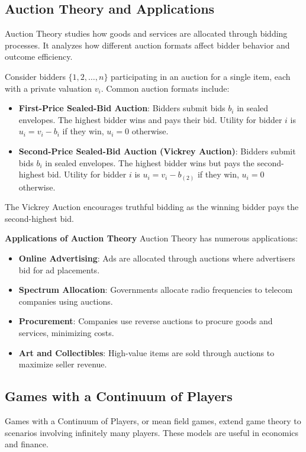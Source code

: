\documentclass[12pt]{book} %
\begin{document}
\subsection{Auction Theory and Applications}
Auction Theory studies how goods and services are allocated through bidding processes. It analyzes how different auction formats affect bidder behavior and outcome efficiency.

Consider bidders $\{1, 2, \ldots, n\}$ participating in an auction for a single item, each with a private valuation $v_i$. Common auction formats include:

\begin{itemize}
    \item \textbf{First-Price Sealed-Bid Auction}: Bidders submit bids $b_i$ in sealed envelopes. The highest bidder wins and pays their bid. Utility for bidder $i$ is $u_i = v_i - b_i$ if they win, $u_i = 0$ otherwise.
    \item \textbf{Second-Price Sealed-Bid Auction (Vickrey Auction)}: Bidders submit bids $b_i$ in sealed envelopes. The highest bidder wins but pays the second-highest bid. Utility for bidder $i$ is $u_i = v_i - b_{(2)}$ if they win, $u_i = 0$ otherwise.
\end{itemize}

The Vickrey Auction encourages truthful bidding as the winning bidder pays the second-highest bid.

\textbf{Applications of Auction Theory}
Auction Theory has numerous applications:

\begin{itemize}
    \item \textbf{Online Advertising}: Ads are allocated through auctions where advertisers bid for ad placements.
    \item \textbf{Spectrum Allocation}: Governments allocate radio frequencies to telecom companies using auctions.
    \item \textbf{Procurement}: Companies use reverse auctions to procure goods and services, minimizing costs.
    \item \textbf{Art and Collectibles}: High-value items are sold through auctions to maximize seller revenue.
\end{itemize}

\subsection{Games with a Continuum of Players}
Games with a Continuum of Players, or mean field games, extend game theory to scenarios involving infinitely many players. These models are useful in economics and finance.
\end{document}
